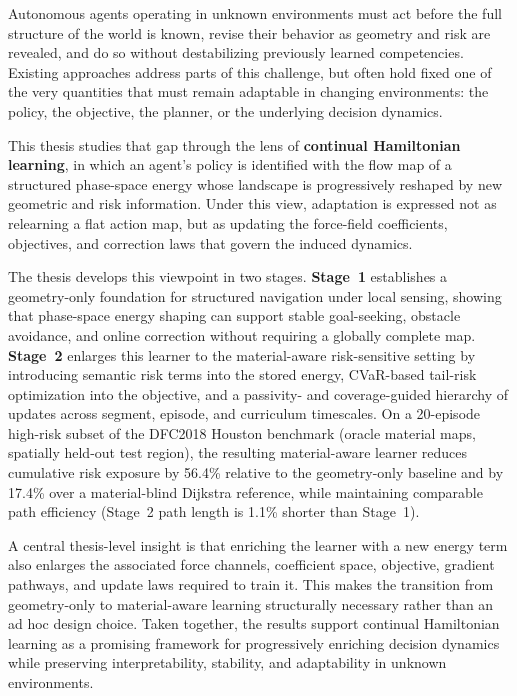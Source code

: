 Autonomous agents operating in unknown environments must act before the
full structure of the world is known, revise their behavior as geometry
and risk are revealed, and do so without destabilizing previously learned
competencies. Existing approaches address parts of this challenge, but
often hold fixed one of the very quantities that must remain adaptable in
changing environments: the policy, the objective, the planner, or the
underlying decision dynamics.

This thesis studies that gap through the lens of \textbf{continual
Hamiltonian learning}, in which an agent's policy is identified with the
flow map of a structured phase-space energy whose landscape is
progressively reshaped by new geometric and risk information. Under this
view, adaptation is expressed not as relearning a flat action map, but as
updating the force-field coefficients, objectives, and correction laws
that govern the induced dynamics.

The thesis develops this viewpoint in two stages. \textbf{Stage~1}
establishes a geometry-only foundation for structured navigation under
local sensing, showing that phase-space energy shaping can support stable
goal-seeking, obstacle avoidance, and online correction without requiring
a globally complete map. \textbf{Stage~2} enlarges this learner to the
material-aware risk-sensitive setting by introducing semantic risk terms
into the stored energy, CVaR-based tail-risk optimization into the
objective, and a passivity- and coverage-guided hierarchy of updates
across segment, episode, and curriculum timescales. On a 20-episode high-risk subset of the DFC2018
Houston benchmark (oracle material maps, spatially held-out test region),
the resulting material-aware learner reduces cumulative
risk exposure by 56.4\% relative to the geometry-only baseline and by 17.4\%
over a material-blind Dijkstra reference, while maintaining comparable path
efficiency (Stage~2 path length is 1.1\% shorter than Stage~1).

A central thesis-level insight is that enriching the learner with a new
energy term also enlarges the associated force channels, coefficient
space, objective, gradient pathways, and update laws required to train
it. This makes the transition from geometry-only to material-aware
learning structurally necessary rather than an ad hoc design choice.
Taken together, the results support continual Hamiltonian learning as a
promising framework for progressively enriching decision dynamics while
preserving interpretability, stability, and adaptability in unknown
environments.
